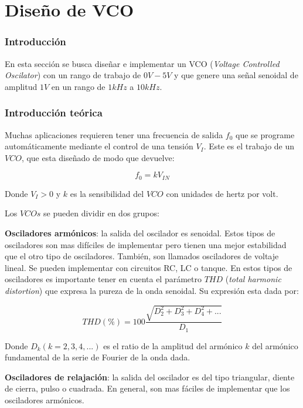 \part{Diseño de VCO}
\section{Introducción}
En esta sección se busca diseñar e implementar un VCO (\textit{Voltage Controlled Oscilator}) con un rango de trabajo de $0V - 5V$ y que genere una señal senoidal de amplitud $1V$ en un rango de $1kHz$ a $10kHz$.

\section{Introducción teórica}

Muchas aplicaciones requieren tener una frecuencia de salida $f_0$ que se programe automáticamente mediante el control de una tensión $V_I$. Este es el trabajo de un $VCO$, que esta diseñado de modo que devuelve:

\begin{equation}
    f_0 = k V_{IN}
    \label{eq:f0}
\end{equation}

Donde $V_I > 0$ y $k$ es la sensibilidad del $VCO$ con unidades de hertz por volt. 



Los $VCOs$ se pueden dividir en dos grupos:


\textbf{Osciladores armónicos}: la salida del oscilador es senoidal. Estos tipos de osciladores son mas difíciles de implementar pero tienen una mejor estabilidad que el otro tipo de osciladores. También, son llamados osciladores de voltaje lineal. Se pueden implementar con circuitos RC, LC o tanque. En estos tipos de osciladores es importante tener en cuenta el parámetro $THD$ (\textit{total harmonic distortion}) que expresa la pureza de la onda senoidal. Su expresión esta dada por:
    
    \begin{displaymath}
        THD (\%) = 100 \frac{\sqrt{D^2_2 + D^2_3 + D^2_4 + ...}}{D_1}
    \end{displaymath}

    Donde $D_k (k=2,3,4,...)$ es el ratio de la amplitud del armónico $k$ del armónico fundamental de la serie de Fourier de la onda dada. 

    
    \textbf{Osciladores de relajación}: la salida del oscilador es del tipo triangular, diente de cierra, pulso o cuadrada. En general, son mas fáciles de implementar que los osciladores armónicos. 
    
